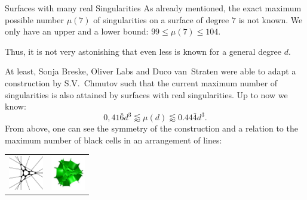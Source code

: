 \begin{surferPage}[216 Singularities]{Surfaces with many real Singularities}
    As already mentioned, the exact maximum possible number
    $\mu(7)$ of singularities on a surface of degree $7$ is not known.
    We only have an upper and a lower bound: $99\le \mu(7) \le 104$. 


    Thus, it is not very astonishing that even less is known for a general degree $d$. 

    At least, Sonja Breske, Oliver Labs and Duco van~Straten were able to adapt a
    construction by S.V.\ Chmutov such that the current maximum
    number of singularities is also attained by surfaces with real
    singularities. 
    Up to now we know:
    \[0,41\bar{6}d^3 \lessapprox \mu(d) \lessapprox 0.44\bar{4} d^3.\]
     From above, one can see the symmetry of the construction and a relation to
    the maximum number of black cells in an arrangement of lines:
    \begin{center}
      \begin{tabular}{c@{\qquad}c}
        \includegraphics[height=1.5cm]{./../../common/images/vielesing.pdf}
        &
        \includegraphics[height=1.5cm]{./../../common/images/p9surface_von_oben}
      \end{tabular}
    \end{center}
\end{surferPage}

